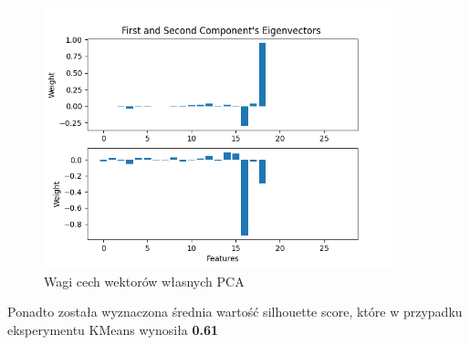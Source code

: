 \documentclass{classrep}
\begin{document}
{{{                \begin{figure}[!htbp]
                    \centering
                    \includegraphics[width=0.9\textwidth]{img/clustering/pca_weights.png}
                    \caption{Wagi cech wektorów własnych PCA}
                    \label{clust_pca_weights}
                \end{figure}
                \FloatBarrier
                
                Ponadto została wyznaczona średnia wartość silhouette score, które w przypadku eksperymentu KMeans wynosiła \textbf{0.61}
                
}}}
\end{document}
